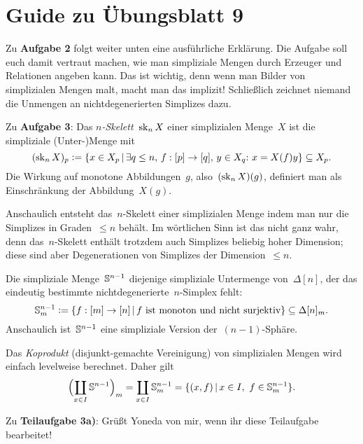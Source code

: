 \documentclass{uebblatt}
\begin{document}
\section*{Guide zu Übungsblatt 9}

Zu \textbf{Aufgabe 2} folgt weiter unten eine ausführliche Erklärung. Die
Aufgabe soll euch damit vertraut machen, wie man simpliziale Mengen durch
Erzeuger und Relationen angeben kann. Das ist wichtig, denn wenn man Bilder von
simplizialen Mengen malt, macht man das implizit! Schließlich zeichnet niemand
die Unmengen an nichtdegenerierten Simplizes dazu.

Zu \textbf{Aufgabe 3}: Das \emph{$n$-Skelett}~$\operatorname{sk}_n X$ einer simplizialen
Menge~$X$ ist die simpliziale (Unter-)Menge mit
\[ (\sk_n X)_p \defeq \{ x \in X_p \,|\,
  \exists q \leq n,\, f : [p] \to [q],\, y \in X_q{:}\ 
  x = X(f)y \} \subseteq X_p. \]
Die Wirkung auf monotone Abbildungen~$g$, also~$(\operatorname{sk}_n X)(g)$, definiert man als
Einschränkung der Abbildung~$X(g)$.

Anschaulich entsteht das~$n$-Skelett einer simplizialen Menge indem man nur die
Simplizes in Graden~$\leq n$ behält. Im wörtlichen Sinn ist das nicht ganz
wahr, denn das~$n$-Skelett enthält trotzdem auch Simplizes beliebig hoher
Dimension; diese sind aber Degenerationen von Simplizes der Dimension~$\leq n$.

Die simpliziale Menge~$\mathbb{S}^{n-1}$ diejenige simpliziale Untermenge
von~$\Delta[n]$, der das eindeutig bestimmte nichtdegenerierte~$n$-Simplex
fehlt:
\[ \mathbb{S}^{n-1}_m \vcentcolon= \{ f : [m] \to [n] \,|\,
  \text{$f$ ist monoton und nicht surjektiv} \} \subseteq \Delta[n]_m. \]
Anschaulich ist~$\mathbb{S}^{n-1}$ eine simpliziale Version der~$(n-1)$-Sphäre.

Das \emph{Koprodukt} (disjunkt-gemachte Vereinigung) von simplizialen Mengen
wird einfach levelweise berechnet. Daher gilt
\[ \Bigl(\coprod_{x \in I} \mathbb{S}^{n-1}\Bigr)_m =
  \coprod_{x \in I} \mathbb{S}^{n-1}_m =
  \{ (x, f) \,|\, x \in I,\ f \in \mathbb{S}^{n-1}_m \}. \]

Zu \textbf{Teilaufgabe 3a)}: Grüßt Yoneda von mir, wenn ihr diese Teilaufgabe
bearbeitet!
\end{document}
